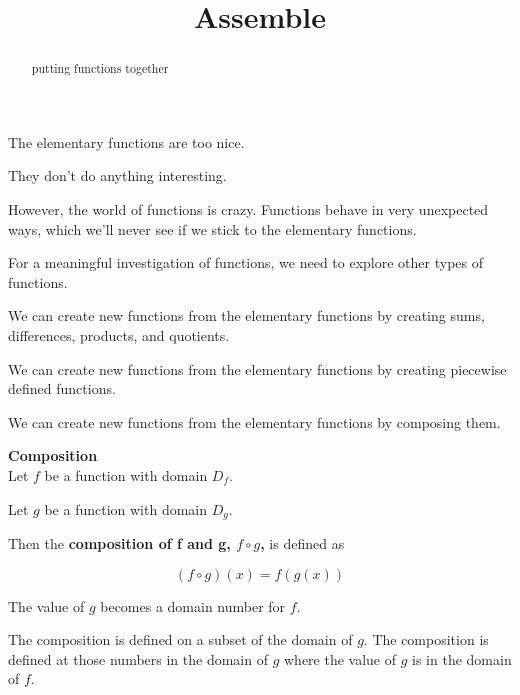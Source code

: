 \documentclass{ximera}
\title{Assemble}
\begin{document}
\begin{abstract}
putting functions together
\end{abstract}
\maketitle





The elementary functions are too nice.

They don't do anything interesting.

However, the world of functions is crazy.  Functions behave in very unexpected ways, which we'll never see if we stick to the elementary functions.

For a meaningful investigation of functions, we need to explore other types of functions.

We can create new functions from the elementary functions by creating sums, differences, products, and quotients.


We can create new functions from the elementary functions by creating piecewise defined functions.


We can create new functions from the elementary functions by composing them. 




\begin{template} \textbf{\textcolor{blue!55!black}{Composition}}  \\


Let $f$ be a function with domain $D_f$.


Let $g$ be a function with domain $D_g$.




Then the \textbf{\textcolor{green!50!black}{composition of f and g, $f \circ g$,}} is defined as

\[
(f \circ g)(x) = f(g(x))
\] 


The value of $g$ becomes a domain number for $f$.


The composition is defined on a subset of the domain of $g$.  The composition is defined at those numbers in the domain of $g$ where the value of $g$ is in the domain of $f$.




\end{template}
\end{document}
